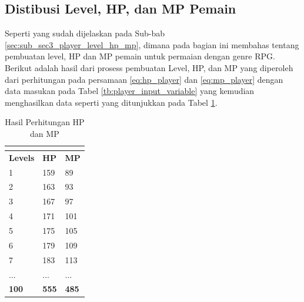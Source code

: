 \subsection{Distibusi Level, HP, dan MP Pemain}
\label{sec:sub_sec4_eval_dist_hp_mp_level_single-character}
\vspace{1ex}

Seperti yang sudah dijelaskan pada Sub-bab \ref{sec:sub_sec3_player_level_hp_mp}, dimana pada bagian ini membahas tentang pembuatan level, HP dan MP pemain untuk permaian dengan genre RPG. Berikut adalah hasil dari prosess pembuatan Level, HP, dan MP yang diperoleh dari perhitungan pada persamaan \ref{eq:hp_player} dan \ref{eq:mp_player} dengan data masukan pada Tabel \ref{tb:player_input_variable} yang kemudian menghasilkan data seperti yang ditunjukkan pada Tabel \ref{tb:player_hp_mp}.

\begin{longtable}{|l|l|l|}
	\caption{Hasil Perhitungan HP dan MP}
	\vspace{1ex}
	\label{tb:player_hp_mp}\\
	\hline
	\rowcolor[HTML]{C0C0C0} 
	\textbf{Levels} & \textbf{HP} & \textbf{MP} \\ \hline
	1 & 159 & 89 \\ \hline
	2 & 163 & 93 \\ \hline
	3 & 167 & 97 \\ \hline
	4 & 171 & 101 \\ \hline
	5 & 175 & 105 \\ \hline
	6 & 179 & 109 \\ \hline
	7 & 183 & 113 \\ \hline
	... & ... & ... \\ \hline
	\textbf{100} & \textbf{555} & \textbf{485} \\ \hline
\end{longtable}
\vspace{1ex}

